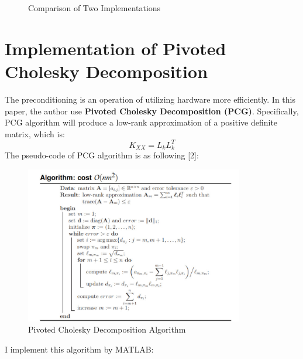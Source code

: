 \documentclass{article} %
\begin{document}
\begin{figure}[H]
	\centering
	\caption{Comparison of Two Implementations}
	\label{fig2}
\end{figure}

\section{Implementation of Pivoted Cholesky Decomposition}
The preconditioning is an operation of utilizing hardware more efficiently. In this paper, the author use \textbf{Pivoted Cholesky Decomposition (PCG)}. Specifically, PCG algorithm will produce a low-rank approximation of a positive definite matrix, which is:
\begin{equation}
K_{XX}=L_kL_k^T
\end{equation} 
The pseudo-code of PCG algorithm is as following [2]:

 \begin{figure}[H]
	\begin{center}
		\includegraphics[width=0.85\textwidth]{PCD}
	\end{center}
	\caption{Pivoted Cholesky Decomposition Algorithm}
	\label{fig2}
\end{figure}
I implement this algorithm by MATLAB:
\end{document}
